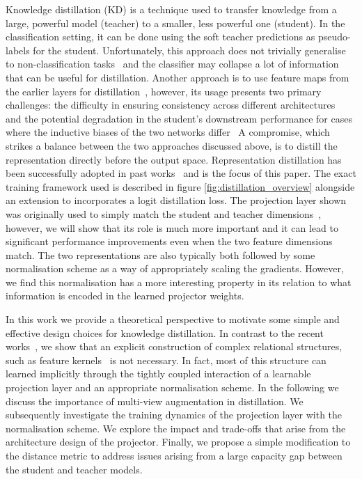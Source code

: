 \documentclass[letterpaper]{article} \usepackage[submission]{aaai23}  \usepackage{times}  \usepackage{helvet}  \usepackage{courier}  \usepackage[hyphens]{url}  \usepackage{graphicx} \urlstyle{rm} \def\UrlFont{\rm}  \usepackage{natbib}  \usepackage{caption} \frenchspacing  \setlength{\pdfpagewidth}{8.5in} \setlength{\pdfpageheight}{11in} \usepackage{algorithm}
\begin{document}
Knowledge distillation (KD) is a technique used to transfer knowledge from a large, powerful model (teacher) to a smaller, less powerful one (student). In the classification setting, it can be done using the soft teacher predictions as pseudo-labels for the student. Unfortunately, this approach does not trivially generalise to non-classification tasks~\cite{Liu2019StructuredSegmentation} and the classifier may collapse a lot of information~\cite{Tishby2015DeepPrinciple} that can be useful for distillation.
Another approach is to use feature maps from the earlier layers for distillation~\cite{Romero2015FitNets:Nets, Zagoruyko2019PayingTransfer}, however, its usage presents two primary challenges: the difficulty in ensuring consistency across different architectures~\cite{Chen2021DistillingReview} and the potential degradation in the student's downstream performance for cases where the inductive biases of the two networks differ~\cite{Tian2019ContrastiveDistillation}
A compromise, which strikes a balance between the two approaches  discussed above, is to distill the representation directly before the output space. Representation distillation has been successfully adopted in past works~\cite{Tian2019ContrastiveDistillation, Zhu2021ComplementaryDistillation, Miles2022InformationDistillation} and is the focus of this paper. The exact training framework used is described in figure \ref{fig:distillation_overview} alongside an extension to incorporates a logit distillation loss. The projection layer shown was originally used to simply match the student and teacher dimensions~\cite{Romero2015FitNets:Nets}, however, we will show that its role is much more important and it can lead to significant performance improvements even when the two feature dimensions match. The two representations are also typically both followed by some normalisation scheme as a way of appropriately scaling the gradients. However, we find this normalisation has a more interesting property in its relation to what information is encoded in the learned projector weights.

In this work we provide a theoretical perspective to motivate some simple and effective design choices for knowledge distillation. In contrast to the recent works~\cite{Tung2019Similarity-preservingDistillation, Miles2022InformationDistillation}, we show that an explicit construction of complex relational structures, such as feature kernels~\cite{He2022FeatureDistillation} is not necessary. In fact, most of this structure can learned implicitly through the tightly coupled interaction of a learnable projection layer and an appropriate normalisation scheme.
In the following we discuss the importance of multi-view augmentation in distillation. We subsequently investigate the training dynamics of the projection layer with the normalisation scheme.  We explore the impact and trade-offs that arise from the architecture design of the projector. Finally, we propose a simple modification to the distance metric to address issues arising from a large capacity gap between the student and teacher models. \\
\end{document}

